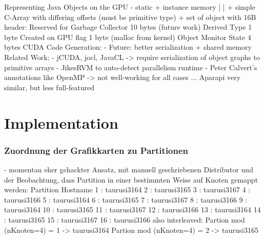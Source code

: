 \begin{frame}
    Representing Java Objects on the GPU
      - static + instance memory
         |              |
         + simple C-Array with differing offsets (must be primitive type)
                        +
            set of object with 16B header:
                Reserved for Garbage Collector 10 bytes (future work)
                Derived Type                    1 byte
                Created on GPU flag             1 byte  (malloc from kernel)
                Object Monitor State            4 bytes
    CUDA Code Generation:
      - Future: better serialization + shared memory
    Related Work:
      - jCUDA, jocl, JavaCL -> require serialization of object graphs to primitive arrays
      - JikesRVM to auto-detect parallelism runtime
      - Peter Calvert’s annotations like OpenMP -> not well-working for all cases ...
      Aparapi very similar, but less full-featured
\end{frame}



\section{Implementation}


\begin{frame}
    \frametitle{Zuordnung der Grafikkarten zu Partitionen}
    - momentan eher gehackter Ansatz, mit manuell geschriebenen Distributor und der Beobachtung, dass Partition in einer bestimmten Weise auf Knoten gemappt werden:
    Partition Hostname
         1 : taurusi3164
         2 : taurusi3165
         3 : taurusi3167
         4 : taurusi3166
         5 : taurusi3164
         6 : taurusi3165
         7 : taurusi3167
         8 : taurusi3166
         9 : taurusi3164
        10 : taurusi3165
        11 : taurusi3167
        12 : taurusi3166
        13 : taurusi3164
        14 : taurusi3165
        15 : taurusi3167
        16 : taurusi3166
     also interleaved:
        Partion mod (nKnoten=4) = 1 -> taurusi3164
        Partion mod (nKnoten=4) = 2 -> taurusi3165
\end{frame}



